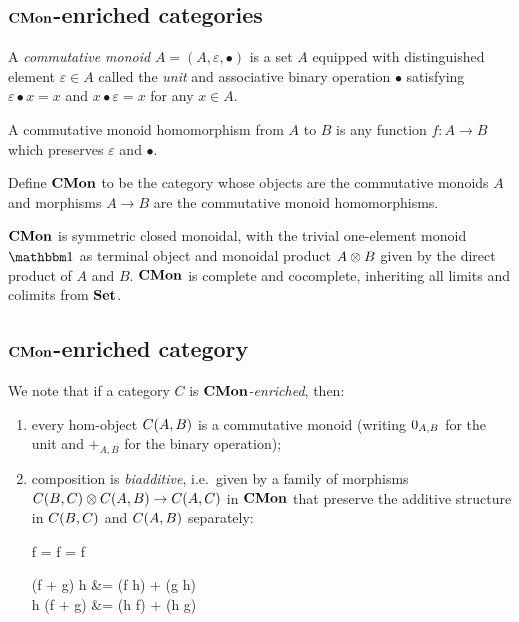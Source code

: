 \subsection{$\mathbf{CMon}$-enriched categories}

\begin{definition}
A \emph{commutative monoid} $A = (A, \varepsilon, \bullet)$ is a set $A$ equipped with distinguished element
$\varepsilon \in A$ called the \emph{unit} and associative binary operation $\bullet$ satisfying $\varepsilon
\bullet x = x$ and $x \bullet \varepsilon = x$ for any $x \in A$.
\end{definition}

A commutative monoid homomorphism from $A$ to $B$ is any function $f: A \to B$ which preserves $\varepsilon$
and $\bullet$.

\begin{definition}
Define $\mathbf{CMon}$ to be the category whose objects are the commutative monoids $A$ and morphisms $A \to B$ are
the commutative monoid homomorphisms.
\end{definition}

$\mathbf{CMon}$ is symmetric closed monoidal, with the trivial one-element monoid $\One$ as terminal object and
monoidal product $A \otimes B$ given by the direct product of $A$ and $B$. $\mathbf{CMon}$ is complete and cocomplete,
inheriting all limits and colimits from $\mathbf{Set}$.

\subsection{$\mathbf{CMon}$-enriched category}

We note that if a category $C$ is \emph{$\mathbf{CMon}$-enriched}, then:
\begin{enumerate}
\item every hom-object ${C}(A,B)$ is a commutative monoid (writing $0_{A,B}$ for the unit and
$+_{A,B}$ for the binary operation);
\item composition is \emph{biadditive}, i.e.~given by a family of morphisms ${C}(B,C) \otimes
{C}(A,B) \to {C}(A,C)$ in $\mathbf{CMon}$ that preserve the additive structure in ${C}(B,C)$ and
${C}(A,B)$ separately:

\begin{salign*}
f \comp \zero = f = \zero \comp f
\end{salign*}
\begin{salign*}
(f + g) \comp h &= (f \comp h) + (g \comp h) \\
h \comp (f + g) &= (h \comp f) + (h \comp g)
\end{salign*}
\end{enumerate}

